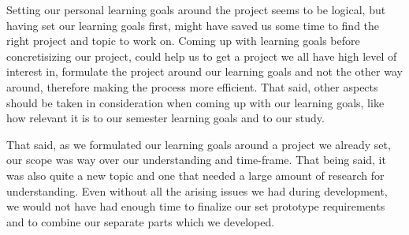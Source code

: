 Setting our personal learning goals around the project seems to be logical, but having set our learning goals first, might have saved us some time to find the right project and topic to work on. Coming up with learning goals before concretisizing our project, could help us to get a project we all have high level of interest in, formulate the project around our learning goals and not the other way around, therefore making the process more efficient. That said, other aspects should be taken in consideration when coming up with our learning goals, like how relevant it is to our semester learning goals and to our study.

That said, as we formulated our learning goals around a project we already set, our scope was way over our understanding and time-frame. That being said, it was also quite a new topic and one that needed a large amount of research for understanding. Even without all the arising issues we had during development, we would not have had enough time to finalize our set prototype requirements and to combine our separate parts which we developed.